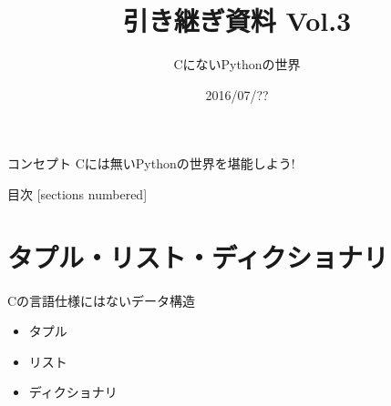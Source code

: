 \documentclass[12pt, xetex, xcolor=pdftex, dvipsnames]{beamer}
\title{引き継ぎ資料 Vol.3}
\subtitle{CにないPythonの世界}
\date{2016/07/??}
\author{}
\institute{}
\begin{document}
\maketitle
\begin{frame}{コンセプト}
    Cには無いPythonの世界を堪能しよう!
\end{frame}
\begin{frame}{目次}
  [sections numbered]
  \tableofcontents[hideallsubsections]
\end{frame}

\section{タプル・リスト・ディクショナリ}
\begin{frame}{Cの言語仕様にはないデータ構造}
    \begin{itemize}
        \item タプル
        \item リスト
        \item ディクショナリ
    \end{itemize}
\end{frame}
\end{document}
